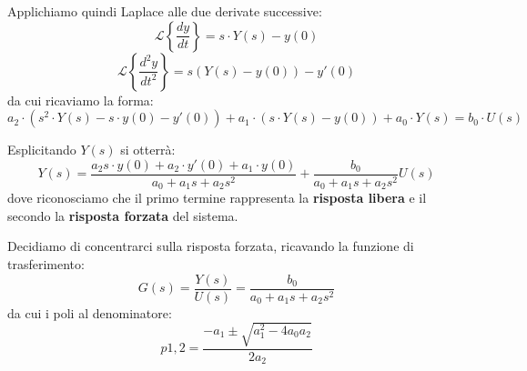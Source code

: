 \documentclass[a4paper,11pt]{article}
\begin{document}
Applichiamo quindi Laplace alle due derivate successive:
$$
\mathcal{L} \left\{ \frac{dy}{dt} \right\} = s \cdot Y(s) - y(0)
$$
$$
\mathcal{L} \left\{ \frac{d^2y}{dt^2} \right\} = s \left( Y(s) - y(0) \right) - y'(0)
$$
da cui ricaviamo la forma:
$$
a_2 \cdot \left( s^2 \cdot Y(s) - s \cdot y(0) - y'(0) \right) + a_1 \cdot \left( s \cdot Y(s) - y(0) \right) + a_0 \cdot Y(s) = b_0 \cdot U(s)
$$

Esplicitando $Y(s)$ si otterrà:
$$
Y(s) = \frac{a_2 s \cdot y(0) + a_2 \cdot y'(0) + a_1 \cdot y(0)}{a_0 + a_1 s + a_2 s^2} + \frac{b_0}{a_0 + a_1 s + a_2 s^2} U(s) 
$$
dove riconosciamo che il primo termine rappresenta la \textbf{risposta libera} e il secondo la \textbf{risposta forzata} del sistema. 

Decidiamo di concentrarci sulla risposta forzata, ricavando la funzione di trasferimento:
$$
G(s) = \frac{Y(s)}{U(s)} = \frac{b_0}{a_0 + a_1 s + a_2 s^2}
$$
da cui i poli al denominatore:
$$
p{1, 2} = \frac{-a_1 \pm \sqrt{a_1^2 - 4 a_0 a_2}}{2 a_2}
$$
\end{document}
